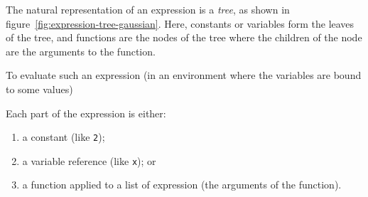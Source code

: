 \documentclass[11pt, a4paper]{article}
\begin{document}
The natural representation of an expression is a \emph{tree}, as shown
in figure~\ref{fig:expression-tree-gaussian}. Here, constants or
variables form the leaves of the tree, and functions are the nodes of
the tree where the children of the node are the arguments to the
function.

To evaluate such an expression (in an environment where the variables
are bound to some values) 


Each part of the expression is either:
\begin{enumerate}
\item a constant (like \texttt{2});
\item a variable reference (like \texttt{x}); or 
\item a function applied to a list of expression (the arguments of the
  function).
\end{enumerate}
\end{document}
